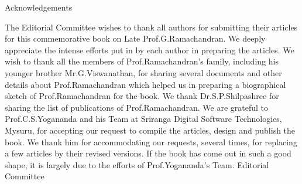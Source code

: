 Acknowledgements

The Editorial Committee wishes to thank all authors for submitting their articles for this commemorative book on Late Prof.G.Ramachandran. We deeply appreciate the intense efforts put in by each author in preparing the articles. We wish to thank all the members of Prof.Ramachandran’s family, including his younger brother Mr.G.Viswanathan, for sharing several documents and other details about Prof.Ramachandran which helped us in preparing a biographical sketch of Prof.Ramachandran for the book. We thank Dr.S.P.Shilpashree for sharing the list of publications of Prof.Ramachandran. We are grateful to Prof.C.S.Yogananda and his Team at Sriranga Digital Software Technologies, Mysuru, for accepting our request to compile the articles, design and publish the book. We thank him for accommodating our requests, several times, for replacing a few articles by their revised versions. If the book has come out in such a good shape, it is largely due to the efforts of Prof.Yogananda’s Team.  
									Editorial Committee
